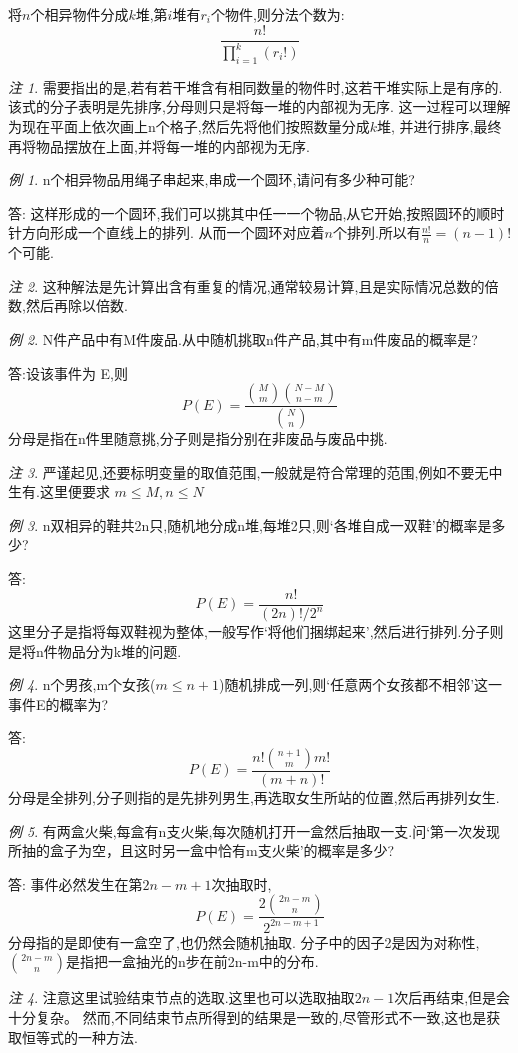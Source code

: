 \documentclass[a4paper,11pt]{article}%
\theoremstyle{remark}
\newtheorem*{remark}{注}
\theoremstyle{remark}
\newtheorem*{example}{例}
\theoremstyle{definition}
\theoremstyle{definition}
\theoremstyle{plain}
\begin{document}
将$n$个相异物件分成$k$堆,第$i$堆有$r_i$个物件,则分法个数为:
\[\frac{n!}{\prod_{i=1}^k(r_i!)}\]
\begin{remark}
    需要指出的是,若有若干堆含有相同数量的物件时,这若干堆实际上是有序的.
    该式的分子表明是先排序,分母则只是将每一堆的内部视为无序.
    这一过程可以理解为现在平面上依次画上n个格子,然后先将他们按照数量分成$k$堆,
    并进行排序,最终再将物品摆放在上面,并将每一堆的内部视为无序.
\end{remark}
\begin{example}
    n个相异物品用绳子串起来,串成一个圆环,请问有多少种可能?

    答:
    这样形成的一个圆环,我们可以挑其中任一一个物品,从它开始,按照圆环的顺时针方向形成一个直线上的排列.
    从而一个圆环对应着$n$个排列.所以有$\frac{n!}{n}=(n-1)!$个可能.
    \begin{remark}
        这种解法是先计算出含有重复的情况,通常较易计算,且是实际情况总数的倍数,然后再除以倍数.
    \end{remark}
\end{example}
\begin{example}
    N件产品中有M件废品.从中随机挑取n件产品,其中有m件废品的概率是?

    答:设该事件为 E,则
    \[P(E)=\frac{\binom{M}{m}\binom{N-M}{n-m}}{\binom{N}{n}}\]
    分母是指在n件里随意挑,分子则是指分别在非废品与废品中挑.
    \begin{remark}
        严谨起见,还要标明变量的取值范围,一般就是符合常理的范围,例如不要无中生有.这里便要求
$m\leq M,n\leq N$
    \end{remark}
\end{example}
\begin{example}
    n双相异的鞋共2n只,随机地分成n堆,每堆2只,则`各堆自成一双鞋'的概率是多少?

    答:
    \[P(E)=\frac{n!}{(2n)!/2^n}\]
    这里分子是指将每双鞋视为整体,一般写作`将他们捆绑起来',然后进行排列.分子则是将n件物品分为k堆的问题.
\end{example}
\begin{example}
    n个男孩,m个女孩($m\leq n+1$)随机排成一列,则`任意两个女孩都不相邻'这一事件E的概率为?
    
    答:
    \[P(E)=\frac{n!\binom{n+1}{m}m!}{(m+n)!}\]
    分母是全排列,分子则指的是先排列男生,再选取女生所站的位置,然后再排列女生.
\end{example}
\begin{example}
    有两盒火柴,每盒有n支火柴,每次随机打开一盒然后抽取一支.问`第一次发现所抽的盒子为空，且这时另一盒中恰有m支火柴'的概率是多少?

    答:
    事件必然发生在第$2n-m+1$次抽取时,
    \[P(E)=\frac{2\binom{2n-m}{n}}{2^{2n-m+1}}\]
    分母指的是即使有一盒空了,也仍然会随机抽取.
    分子中的因子2是因为对称性,$\binom{2n-m}{n}$是指把一盒抽光的n步在前2n-m中的分布.
    \begin{remark}
        注意这里试验结束节点的选取.这里也可以选取抽取$2n-1$次后再结束,但是会十分复杂。
        然而,不同结束节点所得到的结果是一致的,尽管形式不一致,这也是获取恒等式的一种方法.
    \end{remark}
\end{example}
\end{document}
